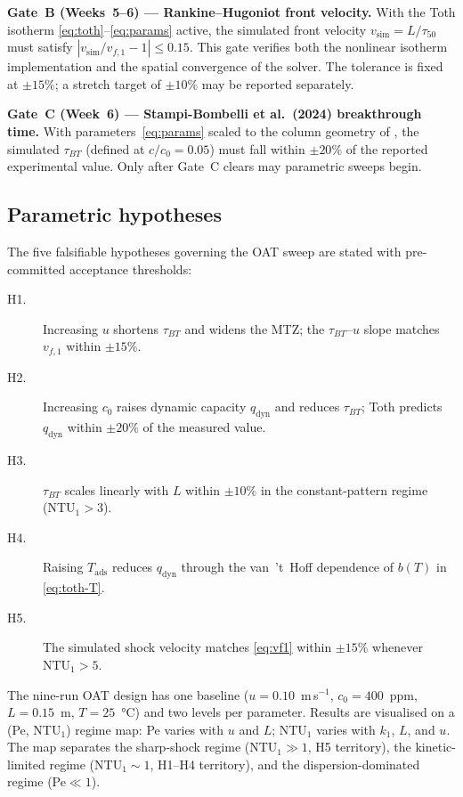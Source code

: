 \documentclass[a4paper]{amsart}
\theoremstyle{definition}
\begin{document}
\medskip
\textbf{Gate~B (Weeks~5--6) --- Rankine--Hugoniot front velocity.}
With the Toth isotherm \eqref{eq:toth}--\eqref{eq:params} active,
the simulated front velocity $v_\text{sim}=L/\tau_{50}$ must satisfy
$|v_\text{sim}/v_{f,1}-1|\leq0.15$.
This gate verifies both the nonlinear isotherm implementation and the
spatial convergence of the solver.  The tolerance is fixed at $\pm15\%$;
a stretch target of $\pm10\%$ may be reported separately.

\medskip
\textbf{Gate~C (Week~6) --- Stampi-Bombelli et al.\ (2024) breakthrough time.}
With parameters~\eqref{eq:params} scaled to the column geometry of
\cite{Stampi2024}, the simulated $\tau_{BT}$ (defined at $c/c_0=0.05$) must
fall within $\pm20\%$ of the reported experimental value.  Only after
Gate~C clears may parametric sweeps begin.

\subsection{Parametric hypotheses}

The five falsifiable hypotheses governing the OAT sweep are stated with
pre-committed acceptance thresholds:

\begin{description}
  \item[H1.] Increasing $u$ shortens $\tau_{BT}$ and widens the MTZ;
    the $\tau_{BT}$--$u$ slope matches $v_{f,1}$  within $\pm15\%$.
  \item[H2.] Increasing $c_0$ raises dynamic capacity $q_\text{dyn}$ and
    reduces $\tau_{BT}$; Toth predicts $q_\text{dyn}$ within $\pm20\%$ of
    the measured value.
  \item[H3.] $\tau_{BT}$ scales linearly with $L$ within $\pm10\%$ in the
    constant-pattern regime (NTU$_1>3$).
  \item[H4.] Raising $T_\text{ads}$ reduces $q_\text{dyn}$ through
    the van~'t~Hoff dependence of $b(T)$ in \eqref{eq:toth-T}.
  \item[H5.] The simulated shock velocity matches \eqref{eq:vf1} within
    $\pm15\%$ whenever $\mathrm{NTU}_1>5$.
\end{description}

The nine-run OAT design has one baseline ($u=0.10$~m\,s$^{-1}$,
$c_0=400$~ppm, $L=0.15$~m, $T=25$~°C) and two levels per parameter.
Results are visualised on a (Pe, NTU$_1$) regime map: Pe varies with $u$
and $L$; NTU$_1$ varies with $k_1$, $L$, and $u$.  The map separates the
sharp-shock regime (NTU$_1\gg1$, H5 territory), the kinetic-limited regime
(NTU$_1\sim1$, H1--H4 territory), and the dispersion-dominated regime
(Pe$\ll1$).
\end{document}
